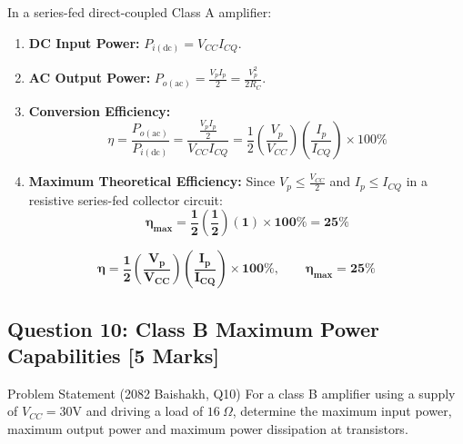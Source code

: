 \documentclass[11pt,a4paper,oneside]{book}
\begin{document}
In a series-fed direct-coupled Class A amplifier:
\begin{enumerate}[leftmargin=1.5em]
  \item \textbf{DC Input Power:} $P_{i(\text{dc})} = V_{CC} I_{CQ}$.
  \item \textbf{AC Output Power:} $P_{o(\text{ac})} = \frac{V_p I_p}{2} = \frac{V_p^2}{2 R_C}$.
  \item \textbf{Conversion Efficiency:}
  \[
  \eta = \frac{P_{o(\text{ac})}}{P_{i(\text{dc})}} = \frac{\frac{V_p I_p}{2}}{V_{CC} I_{CQ}} = \frac{1}{2} \left(\frac{V_p}{V_{CC}}\right) \left(\frac{I_p}{I_{CQ}}\right) \times 100\%
  \]
  \item \textbf{Maximum Theoretical Efficiency:}
  Since $V_p \le \frac{V_{CC}}{2}$ and $I_p \le I_{CQ}$ in a resistive series-fed collector circuit:
  \[
  \mathbf{\eta_{\max} = \frac{1}{2} \left(\frac{1}{2}\right)(1) \times 100\% = 25\%}
  \]
\end{enumerate}

\begin{answerbox}
$$\mathbf{\eta = \frac{1}{2} \left(\frac{V_p}{V_{CC}}\right) \left(\frac{I_p}{I_{CQ}}\right) \times 100\%, \qquad \eta_{\max} = 25\%}$$
\end{answerbox}

\vspace{0.6cm}

\subsection{Question 10: Class B Maximum Power Capabilities [5 Marks]}
\begin{questionbox}{Problem Statement (2082 Baishakh, Q10)}
For a class B amplifier using a supply of $V_{CC} = 30\text{V}$ and driving a load of $16\ \Omega$, determine the maximum input power, maximum output power and maximum power dissipation at transistors.
\end{questionbox}
\end{document}
